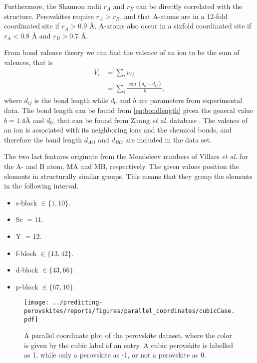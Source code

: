 Furthermore, the Shannon radii $r_A$ and $r_B$ can be directly correlated with the structure. Perovskites require $r_A > r_B$, and that A-atoms are in a 12-fold coordinated site if $r_A > 0.9$ $\text{\AA}$. A-atoms also occur in a sixfold coordinated site if $r_A < 0.8$ $\text{\AA}$ and $r_B >0.7$ $\text{\AA}$.

From bond valence theory we can find the valence of an ion to be the sum of valences, that is
\begin{align}
  V_i &= \sum_i \nu_{ij} \\
  &= \sum_i \frac{\exp(d_o - d_{ij})}{b} \label{eq:bondlength},
\end{align}
where $d_{ij}$ is the bond length while $d_0$ and $b$ are parameters from experimental data. The bond length can be found from \autoref{eq:bondlength} given the general value $b=1.4\text{\AA}$ and $d_0$, that can be found from Zhang \textit{et al}. database \cite{Zhang2007}. The valence of an ion is associated with its neighboring ions and the chemical bonds, and therefore the band length $d_{AO}$ and $d_{BO}$ are included in the data set.

The two last features originate from the Mendeleev numbers of Villars \textit{et al.} \cite{Villars2004} for the A- and B atom, MA and MB, respectively. The given values position the elements in structurally similar groups. This means that they group the elements in the following interval.

\begin{itemize}
  \item s-block $\in \{1,10\}$.
  \item Sc $ = 11$.
  \item Y  $ = 12$.
  \item f-block $\in \{13,42\}$.
  \item d-block $\in \{43,66\}$.
  \item p-block $\in \{67,10\}$.
\end{itemize}

\begin{figure}[ht!]
  \centering
  \texttt{[image: ../predicting-perovskites/reports/figures/parallel\_coordinates/cubicCase.pdf]}
  \vspace*{-130mm}
  \caption{A parallel coordinate plot of the perovskite dataset, where the color is given by the cubic label of an entry. A cubic perovskite is labelled as 1, while only a perovskite as -1, or not a perovskite as 0.}
  \label{fig:plcp}
\end{figure}

